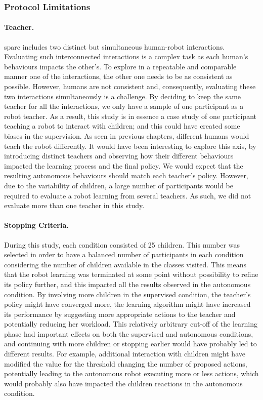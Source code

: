 \subsubsection{Protocol Limitations}

\paragraph{Teacher.}
\gls{sparc} includes two distinct but simultaneous human-robot interactions. Evaluating such interconnected interactions is a complex task as each human's behaviours impacts the other's. To explore in a repeatable and comparable manner one of the interactions, the other one needs to be as consistent as possible. However, humans are not consistent and, consequently, evaluating these two interactions simultaneously is a challenge. By deciding to keep the same teacher for all the interactions, we only have a sample of one participant as a robot teacher. As a result, this study is in essence a case study of one participant teaching a robot to interact with children; and this could have created some biases in the supervision. As seen in previous chapters, different humans would teach the robot differently. It would have been interesting to explore this axis, by introducing distinct teachers and observing how their different behaviours impacted the learning process and the final policy. We would expect that the resulting autonomous behaviours should match each teacher's policy. However, due to the variability of children, a large number of participants would be required to evaluate a robot learning from several teachers. As such, we did not evaluate more than one teacher in this study.

\paragraph{Stopping Criteria.}
During this study, each condition consisted of 25 children. This number was selected in order to have a balanced number of participants in each condition considering the number of  children available in the classes visited. This means that the robot learning was terminated at some point without possibility to refine its policy further, and this impacted all the results observed in the autonomous condition. By involving more children in the supervised condition, the teacher's policy might have converged more, the learning algorithm might have increased its performance by suggesting more appropriate actions to the teacher and potentially reducing her workload. This relatively arbitrary cut-off of the learning phase had important effects on both the supervised and autonomous conditions, and continuing with more children or stopping earlier would have probably led to different results. For example, additional interaction with children might have modified the value for the threshold changing the number of proposed actions, potentially leading to the autonomous robot executing more or less actions, which would probably also have impacted the children reactions in the autonomous condition.

